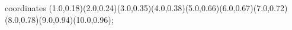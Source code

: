 					coordinates { (1.0,0.18)(2.0,0.24)(3.0,0.35)(4.0,0.38)(5.0,0.66)(6.0,0.67)(7.0,0.72)(8.0,0.78)(9.0,0.94)(10.0,0.96)};